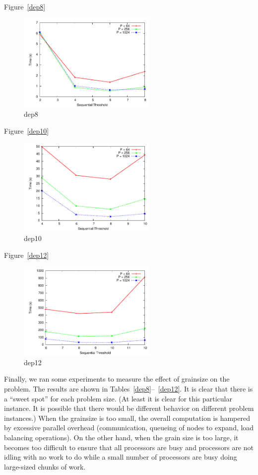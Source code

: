 \documentclass[11pt]{article}
\begin{document}
Figure~\ref{dep8}
\begin{figure}
\centering
\includegraphics[width=0.6\textwidth]{plots/dep8.pdf}
\caption{dep8}
\label{Grainsize control data for depth 8 problems.}
\end{figure}
 
Figure~\ref{dep10}
\begin{figure}
\centering
\includegraphics[width=0.6\textwidth]{plots/dep10.pdf}
\caption{dep10}
\label{Grainsize control data for depth 10 problems.}
\end{figure}
 
Figure~\ref{dep12}
\begin{figure}
\centering
\includegraphics[width=0.6\textwidth]{plots/dep12.pdf}
\caption{dep12}
\label{Grainsize control data for depth 12 problems.}
\end{figure}

Finally, we ran some experiments to measure the effect of grainsize on the problem.  The results are shown in
Tables~\ref{dep8}--~\ref{dep12}.  It is clear that there is a ``sweet spot'' for each problem size.  (At least it is
clear for this particular instance.  It is possible that there would be different behavior on different problem
instances.)  When the grainsize is too small, the overall computation is hampered by excessive parallel overhead
(communication, queueing of nodes to expand, load balancing operations).  On the other hand, when the grain size is too
large, it becomes too difficult to ensure that all processors are busy and processors are not idling with no work to do
while a small number of processors are busy doing large-sized chunks of work.  
\end{document}
